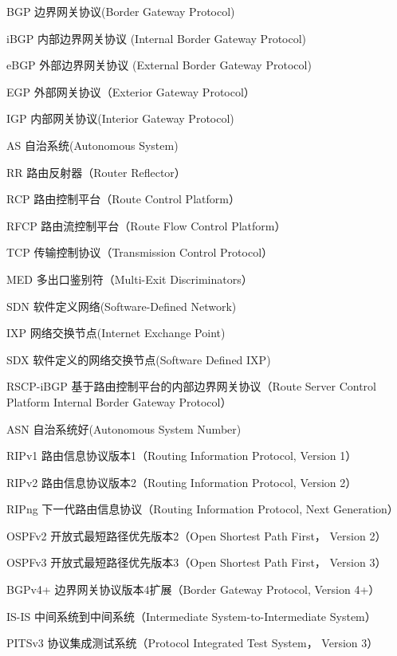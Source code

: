 \begin{denotation}[3cm]
\item[BGP] 边界网关协议(Border Gateway Protocol)
\item[iBGP] 内部边界网关协议 (Internal Border Gateway Protocol)
\item[eBGP] 外部边界网关协议 (External Border Gateway Protocol)
\item[EGP] 外部网关协议（Exterior Gateway Protocol）
\item[IGP] 内部网关协议(Interior Gateway Protocol)
\item[AS] 自治系统(Autonomous System)
\item[RR] 路由反射器（Router Reflector）
\item[RCP] 路由控制平台（Route Control Platform）
\item[RFCP] 路由流控制平台（Route Flow Control Platform）
\item[TCP] 传输控制协议（Transmission Control Protocol）
\item[MED] 多出口鉴别符（Multi-Exit Discriminators）
\item[SDN] 软件定义网络(Software-Defined Network)
\item[IXP] 网络交换节点(Internet Exchange Point)
\item[SDX] 软件定义的网络交换节点(Software Defined IXP)
\item[RSCP-iBGP] 基于路由控制平台的内部边界网关协议（Route Server Control Platform Internal Border Gateway Protocol）
\item[ASN] 自治系统好(Autonomous System Number)
\item[RIPv1] 路由信息协议版本1（Routing Information Protocol, Version 1）
\item[RIPv2] 路由信息协议版本2（Routing Information Protocol, Version 2）
\item[RIPng] 下一代路由信息协议（Routing Information Protocol, Next Generation）
\item[OSPFv2] 开放式最短路径优先版本2（Open Shortest Path First， Version 2）
\item[OSPFv3] 开放式最短路径优先版本3（Open Shortest Path First， Version 3）
\item[BGPv4+] 边界网关协议版本4扩展（Border Gateway Protocol, Version 4+）
\item[IS-IS] 中间系统到中间系统（Intermediate System-to-Intermediate System）
\item[PITSv3] 协议集成测试系统（Protocol Integrated Test System， Version 3）
\end{denotation}
